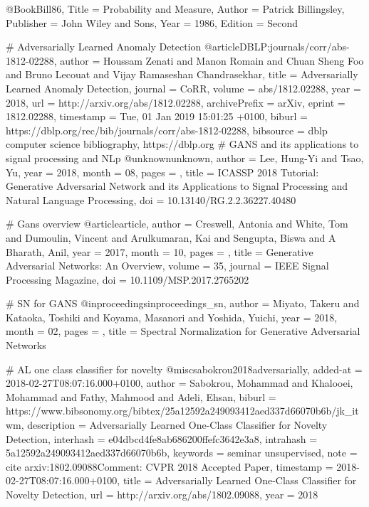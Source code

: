 @Book{Bill86,
  Title                    = {Probability and Measure},
  Author                   = {Patrick Billingsley},
  Publisher                = {John Wiley and Sons},
  Year                     = {1986},
  Edition                  = {Second}
}

# Adversarially Learned Anomaly Detection
@article{DBLP:journals/corr/abs-1812-02288,
  author    = {Houssam Zenati and
               Manon Romain and
               Chuan Sheng Foo and
               Bruno Lecouat and
               Vijay Ramaseshan Chandrasekhar},
  title     = {Adversarially Learned Anomaly Detection},
  journal   = {CoRR},
  volume    = {abs/1812.02288},
  year      = {2018},
  url       = {http://arxiv.org/abs/1812.02288},
  archivePrefix = {arXiv},
  eprint    = {1812.02288},
  timestamp = {Tue, 01 Jan 2019 15:01:25 +0100},
  biburl    = {https://dblp.org/rec/bib/journals/corr/abs-1812-02288},
  bibsource = {dblp computer science bibliography, https://dblp.org}
}
# GANS and its applications to signal processing and NLp
@unknown{unknown,
author = {Lee, Hung-Yi and Tsao, Yu},
year = {2018},
month = {08},
pages = {},
title = {ICASSP 2018 Tutorial: Generative Adversarial Network and its Applications to Signal Processing and Natural Language Processing},
doi = {10.13140/RG.2.2.36227.40480}
}

# Gans overview
@article{article,
author = {Creswell, Antonia and White, Tom and Dumoulin, Vincent and Arulkumaran, Kai and Sengupta, Biswa and A Bharath, Anil},
year = {2017},
month = {10},
pages = {},
title = {Generative Adversarial Networks: An Overview},
volume = {35},
journal = {IEEE Signal Processing Magazine},
doi = {10.1109/MSP.2017.2765202}
}

# SN for GANS
@inproceedings{inproceedings_sn,
author = {Miyato, Takeru and Kataoka, Toshiki and Koyama, Masanori and Yoshida, Yuichi},
year = {2018},
month = {02},
pages = {},
title = {Spectral Normalization for Generative Adversarial Networks}
}

# AL one class classifier for novelty
@misc{sabokrou2018adversarially,
  added-at = {2018-02-27T08:07:16.000+0100},
  author = {Sabokrou, Mohammad and Khalooei, Mohammad and Fathy, Mahmood and Adeli, Ehsan},
  biburl = {https://www.bibsonomy.org/bibtex/25a12592a249093412aed337d66070b6b/jk_itwm},
  description = {Adversarially Learned One-Class Classifier for Novelty Detection},
  interhash = {e04dbcd4fe8ab686200ffefc3642e3a8},
  intrahash = {5a12592a249093412aed337d66070b6b},
  keywords = {seminar unsupervised},
  note = {cite arxiv:1802.09088Comment: CVPR 2018 Accepted Paper},
  timestamp = {2018-02-27T08:07:16.000+0100},
  title = {Adversarially Learned One-Class Classifier for Novelty Detection},
  url = {http://arxiv.org/abs/1802.09088},
  year = 2018
}

